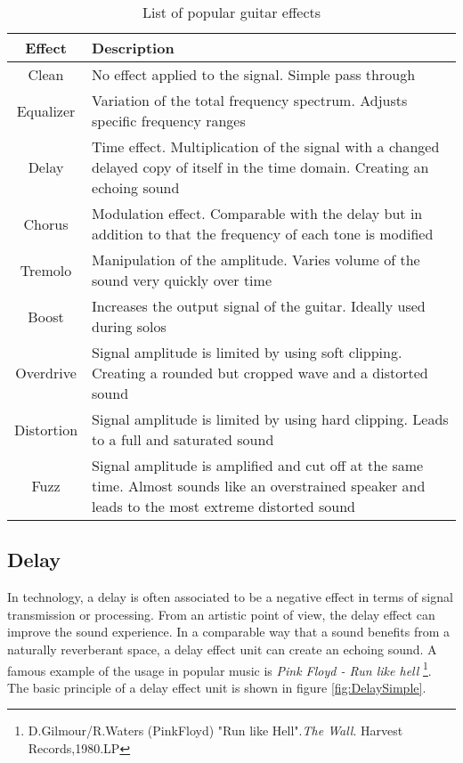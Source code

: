 \begin{table}[H]
\begin{center}
\begin{tabular}{|c|p{10cm}|}
\hline 
\textbf{Effect}  & \textbf{Description} \\ 
\hline 
\hline
Clean &  No effect applied to the signal. Simple pass through \\ 
\hline 
Equalizer & Variation of the total frequency spectrum. Adjusts specific frequency ranges \\ 
\hline
Delay & Time effect. Multiplication of the signal with a changed delayed copy of itself in the time domain.
 Creating an echoing sound \\ 
\hline 
Chorus & Modulation effect. Comparable with the delay but in addition to that the frequency of each tone is modified \\ 
\hline 
Tremolo & Manipulation of the amplitude. Varies volume of the sound very quickly over time\\ 
\hline 
Boost & Increases the output signal of the guitar. Ideally used during solos \\ 
\hline 
Overdrive & Signal amplitude is limited by using soft clipping. Creating a rounded but cropped wave and
a distorted sound \\ 
\hline
Distortion & Signal amplitude is limited by using hard clipping. Leads to a full and saturated sound \\ 
\hline
Fuzz & Signal amplitude is amplified and cut off at the same time. Almost sounds like an overstrained speaker and leads to the most extreme distorted sound\\ 
\hline
\end{tabular} 
\end{center}
\caption{List of popular guitar effects}
\label{tab:guitarEffects}
\end{table}


\subsection{Delay}

In technology, a delay is often associated to be a negative effect in terms of signal transmission or processing. From an artistic point of view, the delay effect can improve the sound experience.
In a comparable way that a sound benefits from a naturally reverberant space, a delay effect unit can create an echoing sound.
A famous example of the usage in popular music is \textit{Pink Floyd - Run like hell} \footnote{D.Gilmour/R.Waters (PinkFloyd) "Run like Hell".\textit{The Wall}. Harvest Records,1980.LP }.
The basic principle of a delay effect unit is shown in figure \ref{fig:DelaySimple}.

